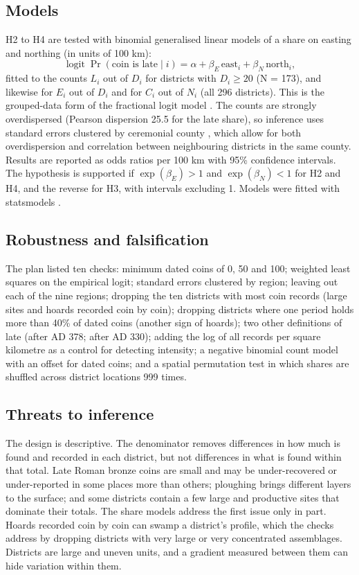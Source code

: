 \documentclass[11pt,a4paper]{article}
\begin{document}
\subsection{Models}
H2 to H4 are tested with binomial generalised linear models of a share on easting and northing (in units of 100 km):
\begin{equation}
\operatorname{logit} \Pr(\text{coin is late} \mid i) = \alpha + \beta_E\, \mathrm{east}_i + \beta_N\, \mathrm{north}_i,
\end{equation}
fitted to the counts $L_i$ out of $D_i$ for districts with $D_i \ge 20$ (N = 173), and likewise for $E_i$ out of $D_i$ and for $C_i$ out of $N_i$ (all 296 districts). This is the grouped-data form of the fractional logit model \citep{papke1996}. The counts are strongly overdispersed (Pearson dispersion 25.5 for the late share), so inference uses standard errors clustered by ceremonial county \citep{cameron2015}, which allow for both overdispersion and correlation between neighbouring districts in the same county. Results are reported as odds ratios per 100 km with 95\% confidence intervals. The hypothesis is supported if $\exp(\beta_E) > 1$ and $\exp(\beta_N) < 1$ for H2 and H4, and the reverse for H3, with intervals excluding 1. Models were fitted with statsmodels \citep{seabold2010}.

\subsection{Robustness and falsification}
The plan listed ten checks: minimum dated coins of 0, 50 and 100; weighted least squares on the empirical logit; standard errors clustered by region; leaving out each of the nine regions; dropping the ten districts with most coin records (large sites and hoards recorded coin by coin); dropping districts where one period holds more than 40\% of dated coins (another sign of hoards); two other definitions of late (after AD 378; after AD 330); adding the log of all records per square kilometre as a control for detecting intensity; a negative binomial count model with an offset for dated coins; and a spatial permutation test in which shares are shuffled across district locations 999 times.

\subsection{Threats to inference}
The design is descriptive. The denominator removes differences in how much is found and recorded in each district, but not differences in what is found within that total. Late Roman bronze coins are small and may be under-recovered or under-reported in some places more than others; ploughing brings different layers to the surface; and some districts contain a few large and productive sites that dominate their totals. The share models address the first issue only in part. Hoards recorded coin by coin can swamp a district's profile, which the checks address by dropping districts with very large or very concentrated assemblages. Districts are large and uneven units, and a gradient measured between them can hide variation within them.
\end{document}
